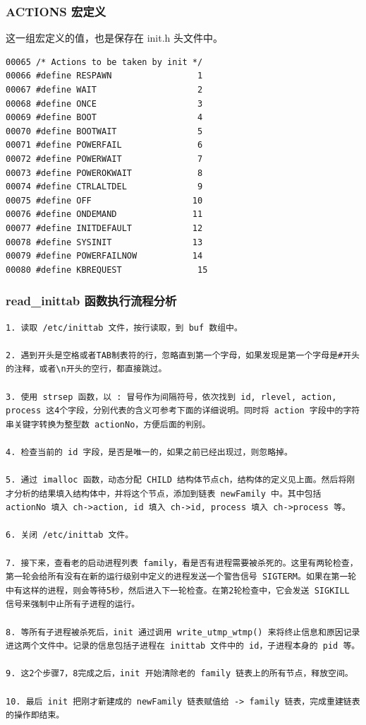 \subsubsection{ACTIONS 宏定义}

这一组宏定义的值，也是保存在 init.h 头文件中。

{\begin{shaded}\begin{verbatim}
00065 /* Actions to be taken by init */
00066 #define RESPAWN                 1
00067 #define WAIT                    2
00068 #define ONCE                    3
00069 #define BOOT                    4
00070 #define BOOTWAIT                5
00071 #define POWERFAIL               6
00072 #define POWERWAIT               7
00073 #define POWEROKWAIT             8
00074 #define CTRLALTDEL              9
00075 #define OFF                    10
00076 #define ONDEMAND               11
00077 #define INITDEFAULT            12
00078 #define SYSINIT                13
00079 #define POWERFAILNOW           14
00080 #define KBREQUEST               15
\end{verbatim}\end{shaded}}
\subsubsection{read\_inittab 函数执行流程分析}

{\begin{shaded}\begin{verbatim}
1. 读取 /etc/inittab 文件，按行读取，到 buf 数组中。

2. 遇到开头是空格或者TAB制表符的行，忽略直到第一个字母，如果发现是第一个字母是#开头的注释，或者\n开头的空行，都直接跳过。

3. 使用 strsep 函数，以 : 冒号作为间隔符号，依次找到 id, rlevel, action, process 这4个字段，分别代表的含义可参考下面的详细说明。同时将 action 字段中的字符串关键字转换为整型数 actionNo，方便后面的判别。

4. 检查当前的 id 字段，是否是唯一的，如果之前已经出现过，则忽略掉。

5. 通过 imalloc 函数，动态分配 CHILD 结构体节点ch，结构体的定义见上面。然后将刚才分析的结果填入结构体中，并将这个节点，添加到链表 newFamily 中。其中包括 actionNo 填入 ch->action, id 填入 ch->id, process 填入 ch->process 等。

6. 关闭 /etc/inittab 文件。

7. 接下来，查看老的启动进程列表 family，看是否有进程需要被杀死的。这里有两轮检查，第一轮会给所有没有在新的运行级别中定义的进程发送一个警告信号 SIGTERM。如果在第一轮中有这样的进程，则会等待5秒，然后进入下一轮检查。在第2轮检查中，它会发送 SIGKILL 信号来强制中止所有子进程的运行。

8. 等所有子进程被杀死后，init 通过调用 write_utmp_wtmp() 来将终止信息和原因记录进这两个文件中。记录的信息包括子进程在 inittab 文件中的 id，子进程本身的 pid 等。

9. 这2个步骤7，8完成之后，init 开始清除老的 family 链表上的所有节点，释放空间。

10. 最后 init 把刚才新建成的 newFamily 链表赋值给 -> family 链表，完成重建链表的操作即结束。
\end{verbatim}\end{shaded}}
